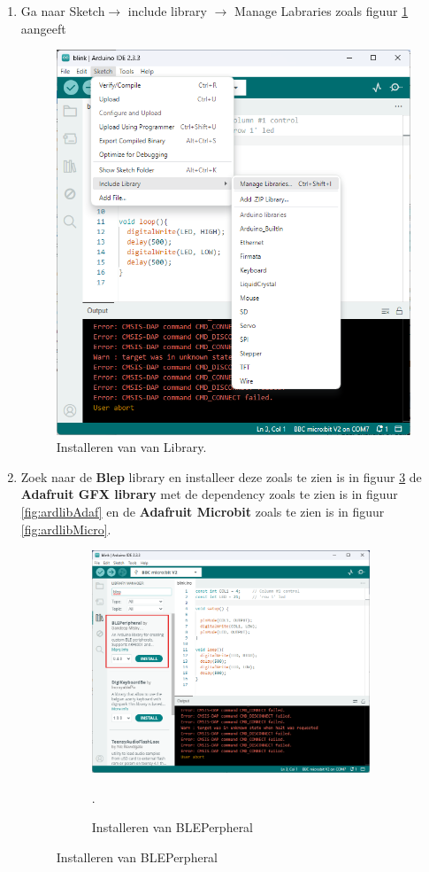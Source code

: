 \begin{enumerate}
	\item Ga naar Sketch$\rightarrow$ include library $\rightarrow$ Manage Labraries zoals figuur \ref{fig:ardLib} aangeeft
	
	   	\begin{figure}[h!]
		\captionsetup{justification=centering}
		\includegraphics[width=0.45 \linewidth]{figuren/arduino_lib}
		\centering
		\caption{Installeren van van Library.}
		\label{fig:ardLib}
	\end{figure}
	\item Zoek naar de \textbf{Blep} library en installeer deze zoals te zien is in figuur \ref{fig:ardlibBl} de \textbf{Adafruit GFX library}  met de  dependency zoals te zien is in figuur \ref{fig:ardlibAdaf} en de \textbf{Adafruit Microbit} zoals te zien is in figuur \ref{fig:ardlibMicro}.
	
\begin{figure}[h!]
	\centering
		\begin{center} 	
			\begin{subfigure}[b]{0.31\textwidth}
				\includegraphics[width=0.98\textwidth]{figuren/arduinoManLibBlep}
				\caption{Installeren van BLEPerpheral }.
				\label{fig:ardlibBl}
				

\end{subfigure}
\end{center}
\end{figure}
\end{enumerate}
